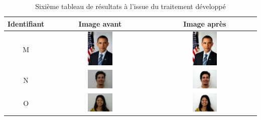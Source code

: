 \documentclass[11pt, french,screen]{report-rd-info}
\begin{document}
\begin{table}
\centering
\begin{tabular}{|c|c|c|}	
   \hline \textbf{Identifiant}  &  \textbf{Image avant}  &  \textbf{Image après}  \\ \hline 
   M & \includegraphics[width=0.25\textwidth]{Resultats/pm_avant} & \includegraphics[width=0.25\textwidth]{Resultats/pm_apres} \\ \hline   
   N & \includegraphics[width=0.25\textwidth]{Resultats/pn_avant} & \includegraphics[width=0.25\textwidth]{Resultats/pn_apres} \\ \hline
   O & \includegraphics[width=0.25\textwidth]{Resultats/po_avant} & \includegraphics[width=0.25\textwidth]{Resultats/po_apres} \\ \hline   
\end{tabular}
\caption{Sixième tableau de résultats à l'issue du traitement développé}
\label{tab:Resultats6}
\end{table}
\end{document}
